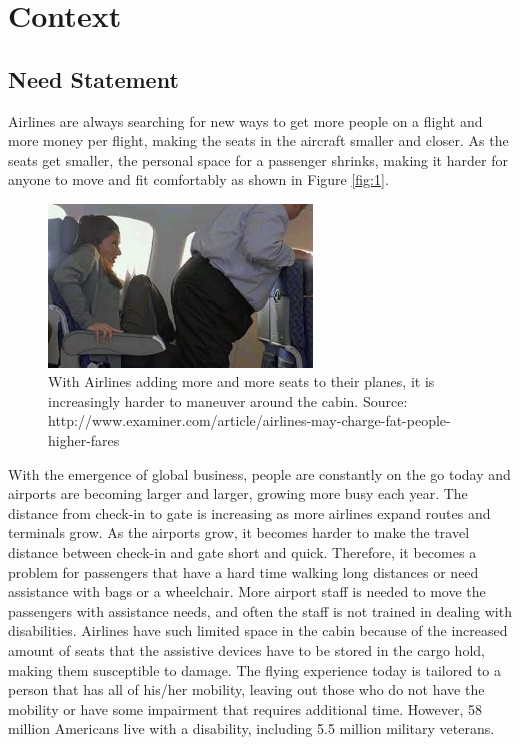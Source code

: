 \chapter{Context}
\label{sec-context} %

\section{Need Statement}
Airlines are always searching for new ways to get more people on a flight and more money per flight, making the seats in the aircraft smaller and closer. As the seats get smaller, the personal space for a passenger shrinks, making it harder for anyone to move and fit comfortably as shown in Figure \ref{fig:1}.

\begin{figure}[h]
  \centering
     \includegraphics[width=7cm]{images/image009.png}
   \caption{With Airlines adding more and more seats to their planes, it is increasingly harder to maneuver around the cabin.
                  Source: http://www.examiner.com/article/airlines-may-charge-fat-people-higher-fares}
  \label{fig:9}
\end{figure}


With the emergence of global business, people are constantly on the go today and airports are becoming larger and larger, growing more busy each year.  The distance from check-in to gate is increasing as more airlines expand routes and terminals grow.  As the airports grow, it becomes harder to make the travel distance between check-in and gate short and quick.  Therefore, it becomes a problem for passengers that have a hard time walking long distances or need assistance with bags or a wheelchair. More airport staff is needed to move the passengers with assistance needs, and often the staff is not trained in dealing with disabilities.  Airlines have such limited space in the cabin because of the increased amount of seats that the assistive devices have to be stored in the cargo hold, making them susceptible to damage.  The flying experience today is tailored to a person that has all of his/her mobility, leaving out those who do not have the mobility or have some impairment that requires additional time. However, 58 million Americans live with a disability, including 5.5 million military veterans. \cite{}

